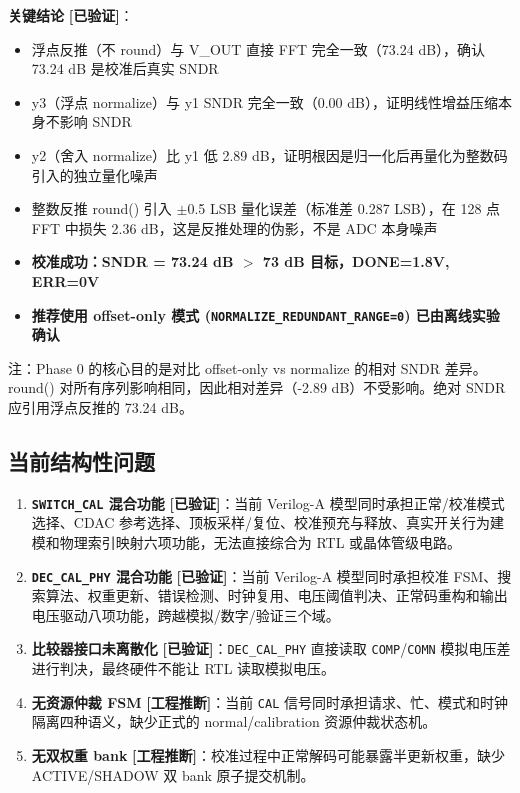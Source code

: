 \documentclass[UTF8,a4paper,11pt]{ctexart}
\newcommand{\verified}{\textcolor{verifiedgreen}{\textbf{[已验证]}}}
\newcommand{\inferred}{\textcolor{inferorange}{\textbf{[工程推断]}}}
\begin{document}
\textbf{关键结论} \verified：
\begin{itemize}[leftmargin=2em]
\item 浮点反推（不 round）与 V\_OUT 直接 FFT 完全一致（73.24 dB），确认 73.24 dB 是校准后真实 SNDR
\item y3（浮点 normalize）与 y1 SNDR 完全一致（0.00 dB），证明线性增益压缩本身不影响 SNDR
\item y2（舍入 normalize）比 y1 低 2.89 dB，证明根因是归一化后再量化为整数码引入的独立量化噪声
\item 整数反推 round() 引入 $\pm$0.5 LSB 量化误差（标准差 0.287 LSB），在 128 点 FFT 中损失 2.36 dB，这是反推处理的伪影，不是 ADC 本身噪声
\item \textbf{校准成功：SNDR = 73.24 dB $>$ 73 dB 目标，DONE=1.8V, ERR=0V}
\item \textbf{推荐使用 offset-only 模式 (\texttt{NORMALIZE\_REDUNDANT\_RANGE=0}) 已由离线实验确认}
\end{itemize}

\noindent 注：Phase 0 的核心目的是对比 offset-only vs normalize 的相对 SNDR 差异。round() 对所有序列影响相同，因此相对差异（-2.89 dB）不受影响。绝对 SNDR 应引用浮点反推的 73.24 dB。

\subsection{当前结构性问题}

\begin{enumerate}[leftmargin=2em]
\item \textbf{\texttt{SWITCH\_CAL} 混合功能} \verified：当前 Verilog-A 模型同时承担正常/校准模式选择、CDAC 参考选择、顶板采样/复位、校准预充与释放、真实开关行为建模和物理索引映射六项功能，无法直接综合为 RTL 或晶体管级电路。
\item \textbf{\texttt{DEC\_CAL\_PHY} 混合功能} \verified：当前 Verilog-A 模型同时承担校准 FSM、搜索算法、权重更新、错误检测、时钟复用、电压阈值判决、正常码重构和输出电压驱动八项功能，跨越模拟/数字/验证三个域。
\item \textbf{比较器接口未离散化} \verified：\texttt{DEC\_CAL\_PHY} 直接读取 \texttt{COMP}/\texttt{COMN} 模拟电压差进行判决，最终硬件不能让 RTL 读取模拟电压。
\item \textbf{无资源仲裁 FSM} \inferred：当前 \texttt{CAL} 信号同时承担请求、忙、模式和时钟隔离四种语义，缺少正式的 normal/calibration 资源仲裁状态机。
\item \textbf{无双权重 bank} \inferred：校准过程中正常解码可能暴露半更新权重，缺少 ACTIVE/SHADOW 双 bank 原子提交机制。
\end{enumerate}
\end{document}
